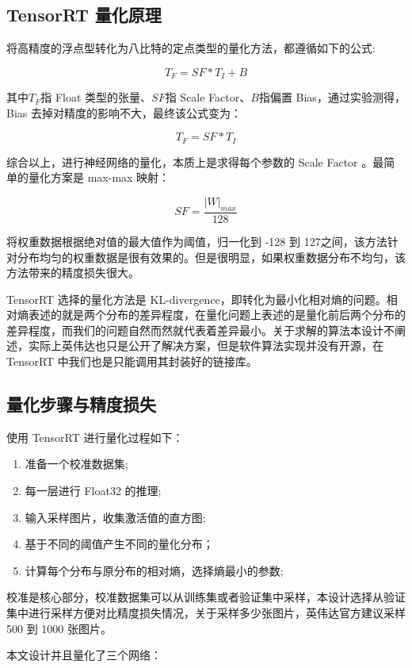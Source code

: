 \subsection{TensorRT 量化原理}

将高精度的浮点型转化为八比特的定点类型的量化方法，都遵循如下的公式:

$$ T_F = SF * T_I + B $$


其中$T_F$指 Float 类型的张量、$SF$指 Scale Factor、$B$指偏置 Bias，通过实验测得，Bias 去掉对精度的影响不大，最终该公式变为：

$$ T_F = SF * T_I $$

综合以上，进行神经网络的量化，本质上是求得每个参数的 Scale Factor 。最简单的量化方案是 max-max 映射：

$$ SF = \frac{|W|_{max}}{128} $$

将权重数据根据绝对值的最大值作为阈值，归一化到 -128 到 127之间，该方法针对分布均匀的权重数据是很有效果的。但是很明显，如果权重数据分布不均匀，该方法带来的精度损失很大。

TensorRT 选择的量化方法是 KL-divergence，即转化为最小化相对熵的问题\cite{shen2019highly}。相对熵表述的就是两个分布的差异程度，在量化问题上表述的是量化前后两个分布的差异程度，而我们的问题自然而然就代表着差异最小。关于求解的算法本设计不阐述，实际上英伟达也只是公开了解决方案，但是软件算法实现并没有开源，在 TensorRT 中我们也是只能调用其封装好的链接库。

\subsection{量化步骤与精度损失}

使用 TensorRT 进行量化\cite{周阳2020神经网络参数压缩和推断加速方法的研究}过程如下：

\begin{enumerate}
    \item 准备一个校准数据集;
    \item 每一层进行 Float32 的推理;
    \item 输入采样图片，收集激活值的直方图;
    \item 基于不同的阈值产生不同的量化分布；
    \item 计算每个分布与原分布的相对熵，选择熵最小的参数;
\end{enumerate}

校准是核心部分，校准数据集可以从训练集或者验证集中采样，本设计选择从验证集中进行采样方便对比精度损失情况，关于采样多少张图片，英伟达官方建议采样 500 到 1000 张图片。

本文设计并且量化了三个网络：

